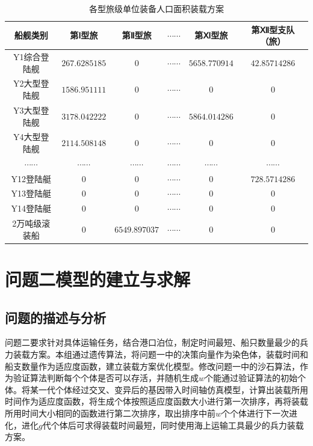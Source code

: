\documentclass{whutmod}
\begin{document}
\begin{table}[H]
\centering		\caption{各型旅级单位装备人口面积装载方案}\label{zhuangzai}
\begin{tabular}{cccccc}
	\toprule[2pt]
	\multicolumn{1}{m{2cm}}{\centering 船舰类别}
	& \multicolumn{1}{m{2cm}}{\centering 第Ⅰ型旅}
	&\multicolumn{1}{m{2cm}}{\centering 第Ⅱ型旅}
	& \multicolumn{1}{m{3cm}}{\centering $ \cdots \cdots  $}
	& \multicolumn{1}{m{2cm}}{\centering 第Ⅺ型旅}
	& \multicolumn{1}{m{2cm}}{\centering 第Ⅻ型支队（旅）}
	\\
	\midrule[1pt]
	Y1综合登陆舰 &  $267.6285185$  &$0$ & $\cdots \cdots$&$5658.770914
	$ &$42.85714286$ \\ 
	Y2大型登陆舰	 &  $1586.951111$&$0$& $\cdots \cdots$ &$0$ &$0$\\ 
	Y3大型登陆舰	 &  $3178.042222 $ &$0$& $\cdots \cdots$ &$5864.014286
	$ &$0$\\ 
	Y4大型登陆舰	 &  $2114.508148 $ &$0$& $\cdots \cdots$ &$0
	$ &$0$\\ 
	$\cdots \cdots$	 &  $\cdots \cdots$  &$\cdots \cdots$ &$\cdots \cdots$ &$\cdots \cdots$ &$\cdots \cdots$\\ 
	Y12登陆艇	 &  $0$ &$0$ & $\cdots \cdots$ &$0$ &$728.5714286$\\ 
	Y13登陆艇	 &  $0$ &$0$ & $\cdots \cdots$ &$0$ &$0$\\ 
	Y14登陆艇		 &  $0$ &$0$ & $\cdots \cdots$ &$0$ &$0$\\ 
	2万吨级滚装船  &  $0 $ &$6549.897037$& $\cdots \cdots$ &$0$ &$0$ \\ 
	\bottomrule[2pt]	
\end{tabular}
\end{table}

	
	
		
	\section{问题二模型的建立与求解}
	\subsection{问题的描述与分析}
	问题二要求针对具体运输任务，结合港口泊位，制定时间最短、船只数量最少的兵力装载方案。本组通过遗传算法，将问题一中的决策向量作为染色体，装载时间和船支数量作为适应度函数，建立装载方案优化模型。修改问题一中的沙石算法，作为验证算法判断每个个体是否可以存活，并随机生成$w$个能通过验证算法的初始个体。将某一代个体经过交叉、变异后的基因带入时间轴仿真模型，计算出装载所用时间作为适应度函数，将生成个体按照适应度函数大小进行第一次排序，再将装载所用时间大小相同的函数进行第二次排序，取出排序中前$w$个个体进行下一次进化，进化$g$代个体后可求得装载时间最短，同时使用海上运输工具最少的兵力装载方案。
\end{document}
